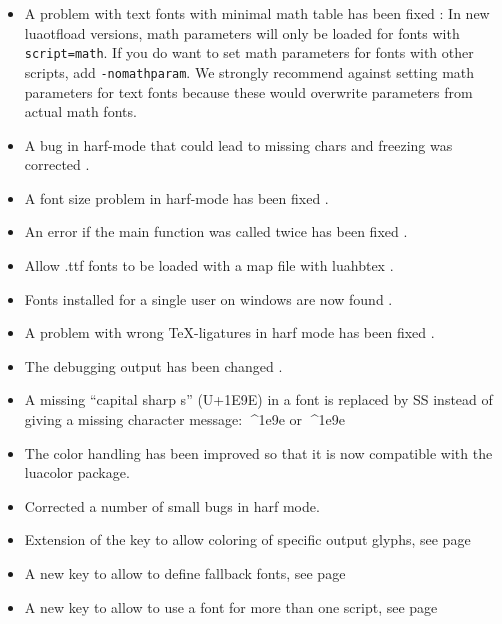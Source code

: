 \begin{itemize}
\item A problem with text fonts with minimal math table has been fixed :
     In new luaotfload versions, math parameters will only be loaded for fonts with \texttt{script=math}.
     If you do want to set math parameters for fonts with other scripts, add \texttt{-nomathparam}.
     We strongly recommend against setting math parameters for text fonts because
     these would overwrite parameters from actual math fonts.
\item A bug in harf-mode that could lead to missing chars and freezing was corrected .
\item A font size problem in harf-mode has been fixed .
\item An error if the main function was called twice has been fixed .
\item Allow .ttf fonts to be loaded with a map file with luahbtex  .
\item Fonts installed for a single user on windows are now found .
\item A problem with wrong \TeX-ligatures in harf mode has been fixed .
\item The debugging output has been changed .
\item A missing \enquote{capital sharp s} (U+1E9E) in a font is replaced by SS instead of giving a missing character message:
      ^^^^1e9e or {\sffamily ^^^^1e9e}
\item The color handling has been improved so that it is now compatible with the luacolor package.
\end{itemize}
\endsubsection
{}
\begin{itemize}
\item Corrected a number of small bugs in harf mode.
\item  Extension of the  key to allow
coloring of specific output glyphs, see page~\pageref{color-glyphs}
\item  A new  key to allow to define fallback fonts, see page~\pageref{fallback}
\item  A new  key to allow to use a font
for more than one script, see page~\pageref{multiscript}
\end{itemize}

